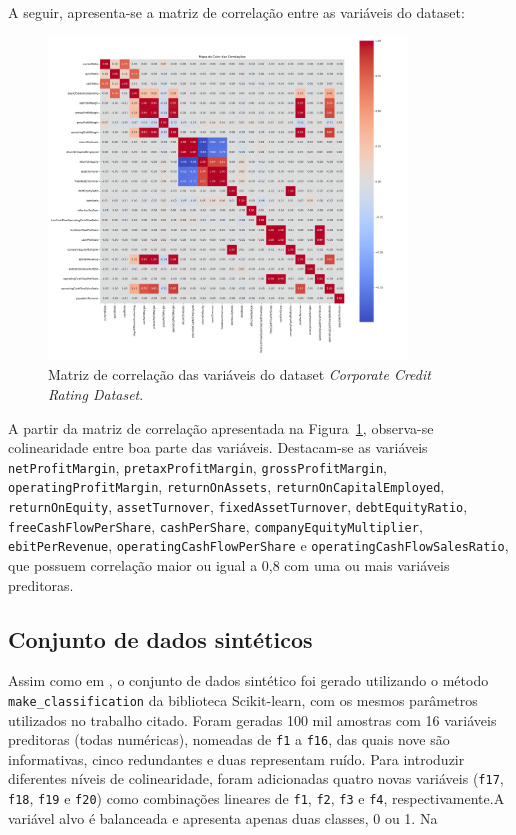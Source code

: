 A seguir, apresenta-se a matriz de correlação entre as variáveis do dataset:

\begin{figure}[H]
    \centering
    \includegraphics[width=0.85\textwidth]{figs/Correlacoes_Corporate_Credit_Rating.png}
    \caption{Matriz de correlação das variáveis do dataset \textit{Corporate Credit Rating Dataset}.}
    \label{fig:matriz_correlacao_corporate_credit_rating}
\end{figure}

A partir da matriz de correlação apresentada na Figura~\ref{fig:matriz_correlacao_corporate_credit_rating}, observa-se colinearidade entre boa parte das variáveis. Destacam-se as variáveis \texttt{netProfitMargin}, \texttt{pretaxProfitMargin}, \texttt{grossProfitMargin}, \texttt{operatingProfitMargin}, \texttt{returnOnAssets}, \texttt{returnOnCapitalEmployed}, \texttt{returnOnEquity}, \texttt{assetTurnover}, \texttt{fixedAssetTurnover}, \texttt{debtEquityRatio}, \texttt{freeCashFlowPerShare}, \texttt{cashPerShare}, \texttt{companyEquityMultiplier}, \texttt{ebitPerRevenue}, \texttt{operatingCashFlowPerShare} e \texttt{operatingCashFlowSalesRatio}, que possuem correlação maior ou igual a 0,8 com uma ou mais variáveis preditoras.



\subsection{Conjunto de dados sintéticos}
Assim como em , o conjunto de dados sintético foi gerado utilizando o método \texttt{make\_classification} da biblioteca Scikit-learn, com os mesmos parâmetros utilizados no trabalho citado. Foram geradas 100 mil amostras com 16 variáveis preditoras (todas numéricas), nomeadas de \texttt{f1} a \texttt{f16}, das quais nove são informativas, cinco redundantes e duas representam ruído. Para introduzir diferentes níveis de colinearidade, foram adicionadas quatro novas variáveis (\texttt{f17}, \texttt{f18}, \texttt{f19} e \texttt{f20}) como combinações lineares de \texttt{f1}, \texttt{f2}, \texttt{f3} e \texttt{f4}, respectivamente.A variável alvo é balanceada e apresenta apenas duas classes, 0 ou 1. Na

